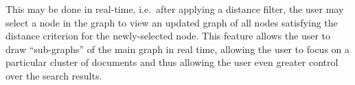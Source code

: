 This may be done in real-time, i.e.\ after applying a distance filter, the user may select a node in the graph to view an updated graph of all nodes satisfying the distance criterion for the newly-selected node. This feature allows the user to draw ``sub-graphs'' of the main graph in real time, allowing the user to focus on a particular cluster of documents and thus allowing the user even greater control over the search results.